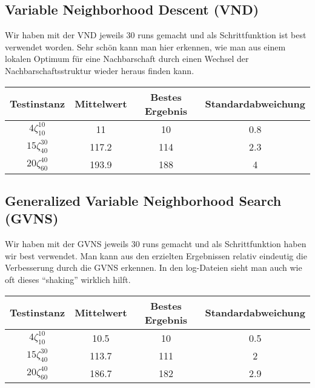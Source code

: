 \documentclass[a4paper,10pt]{article}
\begin{document}
\subsection{Variable Neighborhood Descent (VND)}
Wir haben mit der VND jeweils 30 runs gemacht und als Schrittfunktion ist best verwendet worden. Sehr sch\"{o}n kann man hier erkennen, wie man aus einem lokalen Optimum f\"{u}r eine Nachbarschaft durch einen Wechsel der Nachbarschaftsstruktur wieder heraus finden kann.
\bigskip

\begin{center}
\begin{tabular}{cccc}
\hline
Testinstanz & Mittelwert & Bestes Ergebnis & Standardabweichung \\
\hline
$4\zeta_{10}^{10}$ & 11 & 10 & 0.8 \\									
$15\zeta_{40}^{30}$ & 117.2 & 114 & 2.3 \\									
$20\zeta_{60}^{40}$ & 193.9 & 188 & 4 \\						
\hline
\end{tabular}
\end{center}

\subsection{Generalized Variable Neighborhood Search (GVNS)}

Wir haben mit der GVNS jeweils 30 runs gemacht und als Schrittfunktion haben wir best verwendet. Man kann aus den erzielten Ergebnissen relativ eindeutig die Verbesserung durch die GVNS erkennen. In den log-Dateien sieht man auch wie oft dieses "`shaking"' wirklich hilft.
\bigskip

\begin{center}
\begin{tabular}{cccc}
\hline
Testinstanz & Mittelwert & Bestes Ergebnis & Standardabweichung \\
\hline
$4\zeta_{10}^{10}$ & 10.5 & 10 & 0.5 \\									
$15\zeta_{40}^{30}$ & 113.7 & 111 & 2 \\									
$20\zeta_{60}^{40}$ & 186.7 & 182 & 2.9 \\						
\hline
\end{tabular}
\end{center}
\end{document}
